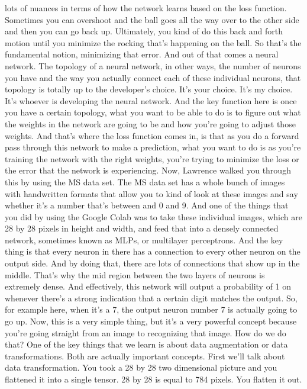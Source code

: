 lots of nuances in terms of how the network learns
based on the loss function.
Sometimes you can overshoot and the ball goes all the way over to the other side
and then you can go back up.
Ultimately, you kind of do this back and forth motion
until you minimize the rocking that's happening on the ball.
So that's the fundamental notion, minimizing that error.
And out of that comes a neural network.
The topology of a neural network, in other ways,
the number of neurons you have and the way you
actually connect each of these individual neurons, that topology is
totally up to the developer's choice.
It's your choice.
It's my choice.
It's whoever is developing the neural network.
And the key function here is once you have a certain topology, what
you want to be able to do is to figure out what the weights in the network
are going to be and how you're going to adjust those weights.
And that's where the loss function comes in,
is that as you do a forward pass through this network
to make a prediction, what you want to do
is as you're training the network with the right weights,
you're trying to minimize the loss or the error
that the network is experiencing.
Now, Lawrence walked you through this by using the MS data set.
The MS data set has a whole bunch of images with handwritten formats
that allow you to kind of look at these images
and say whether it's a number that's between and 0 and 9.
And one of the things that you did by using the Google Colab
was to take these individual images, which
are 28 by 28 pixels in height and width, and feed that
into a densely connected network, sometimes known as MLPs,
or multilayer perceptrons.
And the key thing is that every neuron in there
has a connection to every other neuron on the output side.
And by doing that, there are lots of connections that show up in the middle.
That's why the mid region between the two layers of neurons
is extremely dense.
And effectively, this network will output a probability of 1
on whenever there's a strong indication that a certain digit matches
the output.
So, for example here, when it's a 7, the output neuron number 7
is actually going to go up.
Now, this is a very simple thing, but it's a very powerful concept
because you're going straight from an image to recognizing that image.
How do we do that?
One of the key things that we learn is about data augmentation or data
transformations.
Both are actually important concepts.
First we'll talk about data transformation.
You took a 28 by 28 two dimensional picture
and you flattened it into a single tensor.
28 by 28 is equal to 784 pixels.
You flatten it out.
